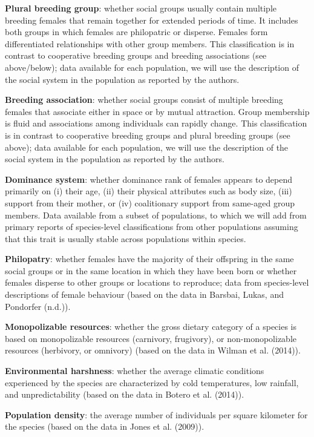 \documentclass[]{article}
\begin{document}
\textbf{Plural breeding group}: whether social groups usually contain
multiple breeding females that remain together for extended periods of
time. It includes both groups in which females are philopatric or
disperse. Females form differentiated relationships with other group
members. This classification is in contrast to cooperative breeding
groups and breeding associations (see above/below); data available for
each population, we will use the description of the social system in the
population as reported by the authors.

\textbf{Breeding association}: whether social groups consist of multiple
breeding females that associate either in space or by mutual attraction.
Group membership is fluid and associations among individuals can rapidly
change. This classification is in contrast to cooperative breeding
groups and plural breeding groups (see above); data available for each
population, we will use the description of the social system in the
population as reported by the authors.

\textbf{Dominance system}: whether dominance rank of females appears to
depend primarily on (i) their age, (ii) their physical attributes such
as body size, (iii) support from their mother, or (iv) coalitionary
support from same-aged group members. Data available from a subset of
populations, to which we will add from primary reports of species-level
classifications from other populations assuming that this trait is
usually stable across populations within species.

\textbf{Philopatry}: whether females have the majority of their
offspring in the same social groups or in the same location in which
they have been born or whether females disperse to other groups or
locations to reproduce; data from species-level descriptions of female
behaviour (based on the data in Barsbai, Lukas, and Pondorfer (n.d.)).

\textbf{Monopolizable resources}: whether the gross dietary category of
a species is based on monopolizable resources (carnivory, frugivory), or
non-monopolizable resources (herbivory, or omnivory) (based on the data
in Wilman et al. (2014)).

\textbf{Environmental harshness}: whether the average climatic
conditions experienced by the species are characterized by cold
temperatures, low rainfall, and unpredictability (based on the data in
Botero et al. (2014)).

\textbf{Population density}: the average number of individuals per
square kilometer for the species (based on the data in Jones et al.
(2009)).
\end{document}
